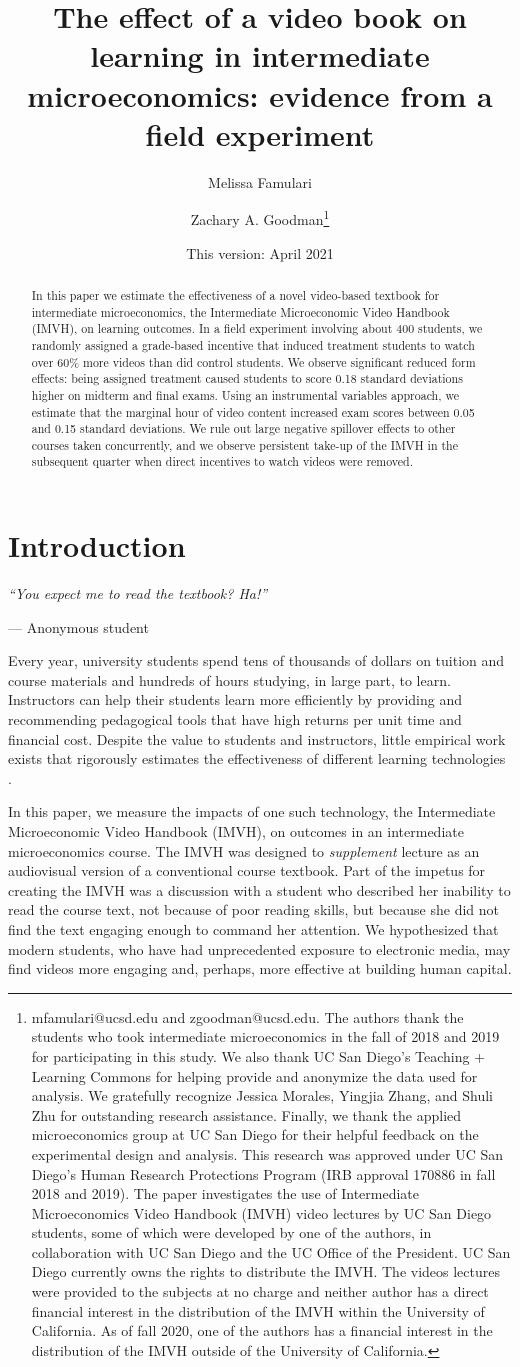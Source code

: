 \documentclass[12pt]{article}
\title{The effect of a video book on learning in intermediate microeconomics:  evidence from a field experiment}
\author{Melissa Famulari}
\author{Zachary A. Goodman\thanks{mfamulari@ucsd.edu and zgoodman@ucsd.edu. The authors thank the students who took intermediate microeconomics in the fall of 2018 and 2019 for participating in this study. We also thank UC San Diego's Teaching + Learning Commons for helping provide and anonymize the data used for analysis. We gratefully recognize Jessica Morales, Yingjia Zhang, and Shuli Zhu for outstanding research assistance. Finally, we thank the applied microeconomics group at UC San Diego for their helpful feedback on the experimental design and analysis. This research was approved under UC San Diego's Human Research Protections Program (IRB approval 170886 in fall 2018 and 2019). The paper investigates the use of Intermediate Microeconomics Video Handbook (IMVH) video lectures by UC San Diego students, some of which were developed by one of the authors, in collaboration with UC San Diego and the UC Office of the President. UC San Diego currently owns the rights to distribute the IMVH. The videos lectures were provided to the subjects at no charge and neither author has a direct financial interest in the distribution of the IMVH within the University of California. As of fall 2020, one of the authors has a financial interest in the distribution of the IMVH outside of the University of California.}}
\affil{University of California, San Diego}
\date{This version: April 2021} %
\begin{document}

\maketitle
\begin{abstract}
	In this paper we estimate the effectiveness of a novel video-based textbook for intermediate microeconomics, the Intermediate Microeconomic Video Handbook (IMVH), on learning outcomes. In a field experiment involving about 400 students, we randomly assigned a grade-based incentive that induced treatment students to watch over 60\% more videos than did control students. We observe significant reduced form effects: being assigned treatment caused students to score 0.18 standard deviations higher on midterm and final exams. Using an instrumental variables approach, we estimate that the marginal hour of video content increased exam scores between 0.05 and 0.15 standard deviations. We rule out large negative spillover effects to other courses taken concurrently, and we observe persistent take-up of the IMVH in the subsequent quarter when direct incentives to watch videos were removed.
\end{abstract}


\section{Introduction}

\epigraph{\textit{``You expect me to read the textbook? Ha!''}}{--- Anonymous student}\bigskip

Every year, university students spend tens of thousands of dollars on tuition and course materials and hundreds of hours studying, in large part, to learn. Instructors can help their students learn more efficiently by providing and recommending pedagogical tools that have high returns per unit time and financial cost. Despite the value to students and instructors, little empirical work exists that rigorously estimates the effectiveness of different learning technologies \parencite{aws2015}.

In this paper, we measure the impacts of one such technology, the Intermediate Microeconomic Video Handbook (IMVH), on outcomes in an intermediate microeconomics course. The IMVH was designed to \textit{supplement} lecture as an audiovisual version of a conventional course textbook. Part of the impetus for creating the IMVH was a discussion with a student who described her inability to read the course text, not because of poor reading skills, but because she did not find the text engaging enough to command her attention. We hypothesized that modern students, who have had unprecedented exposure to electronic media, may find videos more engaging and, perhaps, more effective at building human capital.
\end{document}
